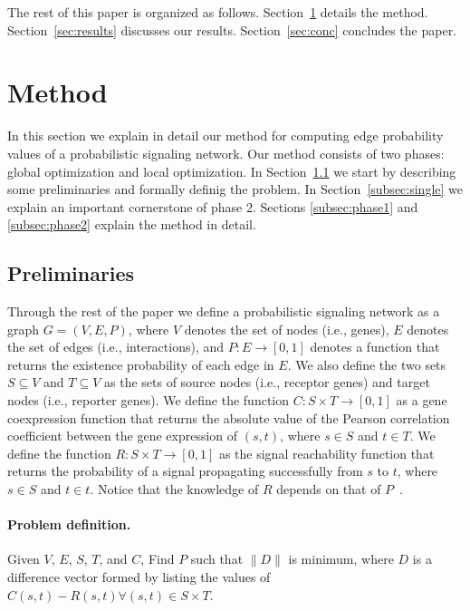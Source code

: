\documentclass[runningheads,a4paper]{llncs}
\begin{document}
The rest of this paper is organized as follows. Section~\ref{sec:method}
details the method. Section~\ref{sec:results} discusses our results.
Section~\ref{sec:conc} concludes the paper.

\section{Method}
\label{sec:method}

In this section we explain in detail our method for computing edge probability
values of a probabilistic signaling network. Our method consists of two phases:
global optimization and local optimization. In Section~\ref{subsec:def} we start
by describing some preliminaries and formally definig the problem. In
Section~\ref{subsec:single} we explain an important cornerstone of phase 2.
Sections \ref{subsec:phase1} and \ref{subsec:phase2} explain the method in
detail.

\subsection{Preliminaries}
\label{subsec:def}
Through the rest of the paper we define a probabilistic signaling network as a
graph $G = (V, E, P)$, where $V$ denotes the set of nodes (i.e., genes), $E$
denotes the set of edges (i.e., interactions), and $P: E \rightarrow [0, 1]$
denotes a function that returns the existence probability of each edge in $E$.
We also define the two sets $S \subseteq V$ and $T \subseteq V$ as the sets of
source nodes (i.e., receptor genes) and target nodes (i.e., reporter genes). We
define the function $C: S \times T \rightarrow [0, 1]$ as a gene coexpression
function that returns the absolute value of the Pearson correlation coefficient
between the gene expression of $(s, t)$, where $s \in S$ and $t \in T$. We
define the function $R: S \times T \rightarrow [0, 1]$ as the signal
reachability function that returns the probability of a signal propagating successfully from
$s$ to $t$, where $s \in S$ and $t \in t$. Notice that the knowledge of $R$
depends on that of $P$~\cite{preach}.

\paragraph{\textbf{Problem definition.}} Given $V$, $E$, $S$, $T$, and $C$, Find
$P$ such that $\|D\|$ is minimum, where $D$ is a difference vector formed by
listing the values of $C(s, t) - R(s, t) \forall (s, t) \in S \times T$.
\end{document}
